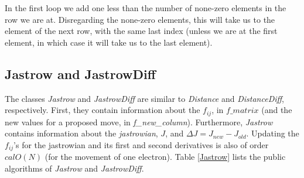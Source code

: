 In the first loop we add one less than the number of none-zero
elements in the row we are at. Disregarding the none-zero elements,
this will take us to the element of the next row, with the same last index
(unless we are at the first element, in which case it will take us
to the last element).





\subsection{Jastrow and JastrowDiff}

The classes \emph{Jastrow} and \emph{JastrowDiff} are similar to
\emph{Distance} and \emph{DistanceDiff}, respectively. First, they
contain information about the $f_{ij}$, in $f\_matrix$ (and the new
values for a proposed move, in \emph{f\_new\_column}). 
Furthermore, \emph{Jastrow} contains information about
the \emph{jastrowian}, $J$, and $\Delta J=J_{new}-J_{old}$.
Updating the $f_{ij}$'s for the jastrowian and its first and second
derivatives is also of order ${cal O}(N)$ (for the movement of one
electron).
Table \ref{Jastrow} lists the public algorithms of \emph{Jastrow} and
\emph{JastrowDiff}.

